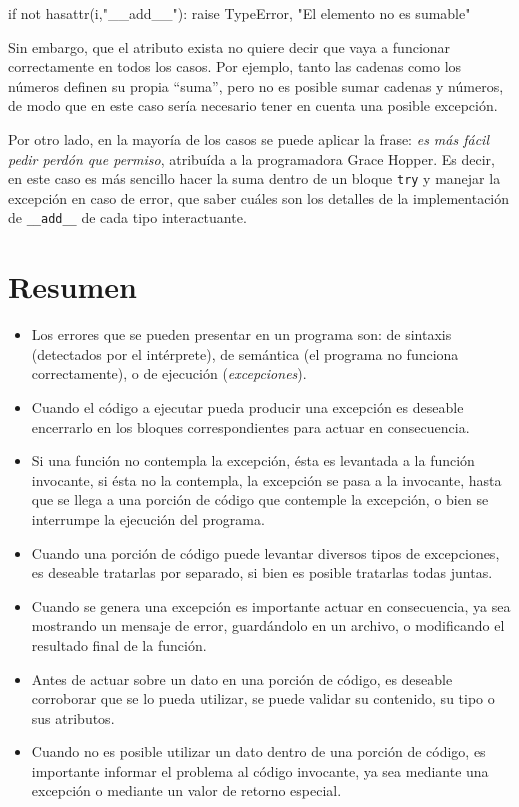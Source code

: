 \begin{codigo-python-sn}
if not hasattr(i,"__add__"):
	raise TypeError, "El elemento no es sumable"
\end{codigo-python-sn}

Sin embargo, que el atributo exista no quiere decir que vaya a funcionar
correctamente en todos los casos. Por ejemplo, tanto las cadenas como los
números definen su propia ``suma'', pero no es posible sumar cadenas y
números, de modo que en este caso sería necesario tener en cuenta una
posible excepción.

Por otro lado, en la mayoría de los casos se puede aplicar la frase: {\it
es más fácil pedir perdón que permiso}, atribuída a la programadora Grace
Hopper. Es decir, en este caso es más sencillo hacer la suma dentro de un
bloque \lstinline!try! y manejar la excepción en caso de error, que saber
cuáles son los detalles de la implementación de \lstinline!__add__! de cada
tipo interactuante.

\section{Resumen}

\begin{itemize}
\item Los errores que se pueden presentar en un programa son: de sintaxis
(detectados por el intérprete), de semántica (el programa no funciona
correctamente), o de ejecución ({\it excepciones}).
\item Cuando el código a ejecutar pueda producir una excepción es deseable
encerrarlo en los bloques correspondientes para actuar en consecuencia.
\item Si una función no contempla la excepción, ésta es levantada a la
función invocante, si ésta no la contempla, la excepción se pasa a la
invocante, hasta que se llega a una porción de código que contemple la
excepción, o bien se interrumpe la ejecución del programa.
\item Cuando una porción de código puede levantar diversos tipos de
excepciones, es deseable tratarlas por separado, si bien es posible
tratarlas todas juntas.
\item Cuando se genera una excepción es importante actuar en consecuencia,
ya sea mostrando un mensaje de error, guardándolo en un archivo, o
modificando el resultado final de la función.
\item Antes de actuar sobre un dato en una porción de código, es deseable
corroborar que se lo pueda utilizar, se puede validar su contenido, su tipo
o sus atributos.
\item Cuando no es posible utilizar un dato dentro de una porción de
código, es importante informar el problema al código invocante, ya sea
mediante una excepción o mediante un valor de retorno especial.
\end{itemize}


